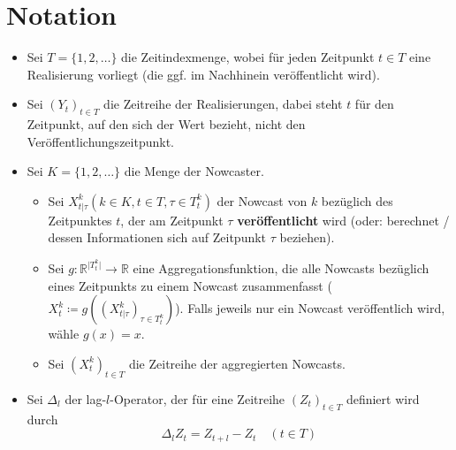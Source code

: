 \documentclass{article}
\theoremstyle{plain}%
\theoremstyle{definition}
\newcommand{\lag}[1][l]{\Delta_{#1}}
\begin{document}
\section{Notation}
\begin{itemize}
  \item Sei $T = \{1, 2, \dots\}$ die Zeitindexmenge, wobei für jeden Zeitpunkt $t \in T$ eine Realisierung vorliegt (die ggf. im Nachhinein veröffentlicht wird).
  \item Sei $(Y_t)_{t \in T}$ die Zeitreihe der Realisierungen, dabei steht $t$ für den Zeitpunkt, auf den sich der Wert bezieht, nicht den Veröffentlichungszeitpunkt.
  \item Sei $K = \{1, 2, \dots\}$ die Menge der Nowcaster.
	\begin{itemize}
	  \item Sei $X_{t \lvert \tau}^k (k \in K, t \in T, \tau \in T_t^k)$ der Nowcast von $k$ bezüglich des Zeitpunktes $t$, der am Zeitpunkt $\tau$ \textbf{veröffentlicht} wird (oder: berechnet / dessen Informationen sich auf Zeitpunkt $\tau$ beziehen).
	  \item Sei $g: \mathbb{R}^{\lvert T_t^k \lvert} \rightarrow \mathbb{R}$ eine Aggregationsfunktion, die alle Nowcasts bezüglich eines Zeitpunkts zu einem Nowcast zusammenfasst ($X_t^k \coloneqq g((X_{t \lvert \tau}^k)_{\tau \in T_t^k})$). Falls jeweils nur ein Nowcast veröffentlich wird, wähle $g(x) = x$.
	  \item Sei $(X_t^k)_{t \in T}$ die Zeitreihe der aggregierten Nowcasts.
	\end{itemize}
  \item Sei $\lag[l]$ der lag-$l$-Operator, der für eine Zeitreihe $(Z_t)_{t \in T}$ definiert wird durch 
		\begin{equation}
			\lag[l]Z_t = Z_{t+l} - Z_t \quad (t \in T)
		\end{equation} 
  \end{itemize}
\end{document}
